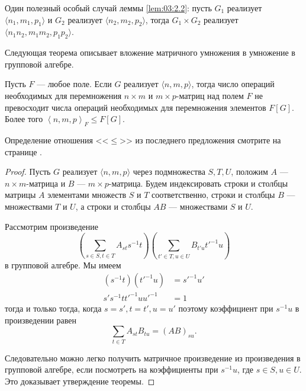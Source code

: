 Один полезный особый случай леммы \ref{lem:03:2.2}: пусть $G_1$ реализует $\langle n_1, m_1, p_1 \rangle$ и $G_2$ реализует $\langle n_2, m_2, p_2 \rangle$, тогда $G_1 \times G_2$ реализует $\langle n_1n_2, m_1m_2, p_1p_2 \rangle$.

Следующая теорема описывает вложение матричного умножения в умножение в групповой алгебре.

\begin{theorem}\label{th:03:2.3}
  Пусть $F$ --- любое поле. Если $G$ реализует $\langle n, m, p \rangle$, тогда число операций необходимых для перемножения $n \times m$ и $m \times p$-матриц над полем $F$ не превосходит числа операций необходимых для перемножения элементов $F[G]$. Более того $\left\langle n,m,p \right\rangle_F \leq F[G]$.
\end{theorem}

Определение отношения <<$\leq$>> из последнего предложения смотрите на странице \pageref{def:bi:6.2}.

\begin{proof}
Пусть $G$ реализует $\langle n, m, p \rangle$ через подмножества $S, T, U$, положим $A$ --- $n \times m$-матрица и $B$ --- $m \times p$-матрица. Будем индексировать строки и столбцы матрицы $A$ элементами множеств $S$ и $T$ соответственно, строки и столбцы $B$ --- множествами $T$ и $U$, а строки и столбцы $AB$ --- множествами $S$ и $U$.

Рассмотрим произведение
\[
	\left( \sum_{s \in S, t \in T} A_{st} s^{-1}t \right)\left( \sum_{t' \in T, u \in U} B_{t'u} t'^{-1}u \right)
\]
в групповой алгебре. Мы имеем
\begin{align*}
     (s^{-1}t)(t'^{-1}u) & = s'^{-1}u'\\
     s's^{-1}tt'^{-1}uu'^{-1} & = 1
\end{align*}
тогда и только тогда, когда $s=s', t=t', u=u'$ поэтому коэффициент при $s^{-1}u$ в произведении равен
\[
	\sum_{t \in T} A_{st}B_{tu} = (AB)_{su}.
\]

Следовательно можно легко получить матричное произведение из произведения в групповой алгебре, если посмотреть на коэффициенты при $s^{-1}u$, где $s \in S, u \in U$. Это доказывает утверждение теоремы.
\end{proof}


